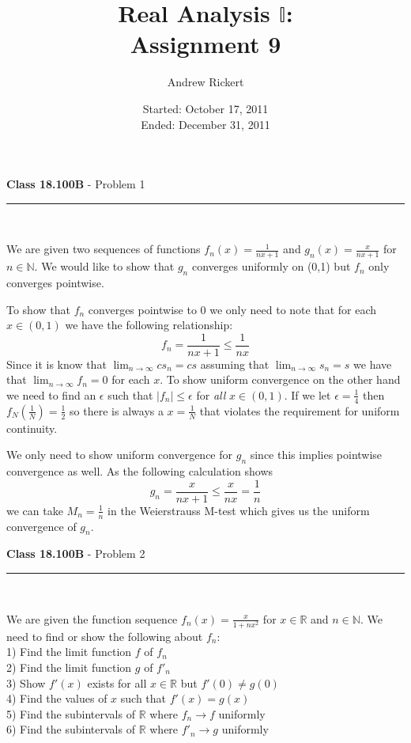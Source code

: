 \documentclass[11pt,reqno]{article}
\title{Real Analysis $\mathbb{I}$: \\ Assignment 9}
\author{Andrew Rickert}
\date{Started: October 17, 2011 \\ \hspace{1pt} Ended: December 31,  2011}                                           %
\begin{document}
\maketitle


\begin{flushleft} 
\textbf{Class 18.100B} - Problem 1\\
\rule{500pt}{1pt}\\
\end{flushleft} 

We are given two sequences of functions $f_n(x) = \frac{1}{nx + 1}$ and $g_n(x) = \frac{x}{nx+1}$ for $n \in \mathbb{N}$. We would like to show that $g_n$ converges uniformly on (0,1) but $f_n$ only converges pointwise.

To show that $f_n$ converges pointwise to 0 we only need to note that for each $x \in (0,1)$ we have the following relationship:
\[ f_n = \frac{1}{nx + 1} \le \frac{1}{nx}\]
Since it is know that $\lim_{n \to \infty} c s_n = c s$ assuming that $\lim_{n \to \infty}s_n = s$ we have that $\lim_{n \to \infty} f_n = 0$ for each $x$. To show uniform convergence on the other hand we need to find an $\epsilon$ such that $|f_n| \le \epsilon$ for \emph{all} $x \in (0,1)$. If we let $\epsilon = \frac{1}{4}$ then $f_N(\frac{1}{N}) = \frac{1}{2}$ so there is always a $x = \frac{1}{N}$ that violates the requirement for uniform continuity.

\indent We only need to show uniform convergence for $g_n$ since this implies pointwise convergence as well. As the following calculation shows
\[ g_n = \frac{x}{nx+1} \le \frac{x}{nx} = \frac{1}{n} \]
we can take $M_n = \frac{1}{n}$ in the Weierstrauss M-test which gives us the uniform convergence of $g_n$.

\vspace{15pt}
\begin{flushleft} 
\textbf{Class 18.100B} - Problem 2\\
\rule{500pt}{1pt}\\
\end{flushleft} 

We are given the function sequence $f_n(x) = \frac{x}{1+nx^2}$ for $x \in \mathbb{R}$ and $n \in \mathbb{N}$. We need to find or show the following about $f_n$:\\
1) Find the limit function $f$ of $f_n$\\
2) Find the limit function $g$ of $f'_n$\\
3) Show $f'(x)$ exists for all $x \in \mathbb{R}$ but $f'(0) \neq g(0)$\\
4) Find the values of $x$ such that $f'(x) = g(x)$\\
5) Find the subintervals of $\mathbb{R}$ where $f_n \to f$ uniformly\\
6) Find the subintervals of $\mathbb{R}$ where $f'_n \to g$ uniformly\\
\end{document}
